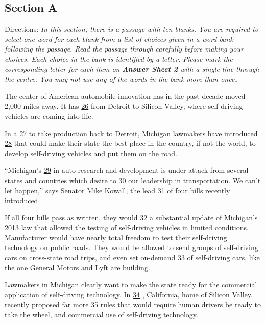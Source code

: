 \documentclass[UTF8,11pt]{ctexart}
\begin{document}
\subsection*{Section A}


Directions:\textit{ In this section, there is a passage with ten blanks. You are required to select one word for each blank} \textit{from a list of choices given in a word bank following the passage. Read the passage through carefully before} \textit{making your choices. Each choice in the bank is identified by a letter. Please mark the corresponding letter for} \textit{each item on}\textbf{\textit{ Answer Sheet 2}}\textit{ with a single line through the centre. You may not use any of the words in the bank} \textit{more than once}．


The center of American automobile innovation has in the past decade moved 2,000 miles away. It has \uline{26} from Detroit to Silicon Valley, where self-driving vehicles are coming into life.


In a \uline{27} to take production back to Detroit, Michigan lawmakers have introduced \uline{28} that could make their state the best place in the country, if not the world, to develop self-driving vehicles and put them on the road.


“Michigan’s \uline{29} in auto research and development is under attack from several states and countries which desire to \uline{30} our leadership in transportation. We can’t let happen,” says Senator Mike Kowall, the lead \uline{31} of four bills recently introduced.


If all four bills pass as written, they would \uline{32} a substantial update of Michigan’s 2013 law that allowed the testing of self-driving vehicles in limited conditions. Manufacturer would have nearly total freedom to test their self-driving technology on public roads. They would be allowed to send groups of self-driving cars on cross-state road trips, and even set on-demand \uline{33} of self-driving cars, like the one General Motors and Lyft are building.


Lawmakers in Michigan clearly want to make the state ready for the commercial application of self-driving technology. In \uline{34} , California, home of Silicon Valley, recently proposed far more \uline{35} rules that would require human drivers be ready to take the wheel, and commercial use of self-driving technology.
\end{document}
